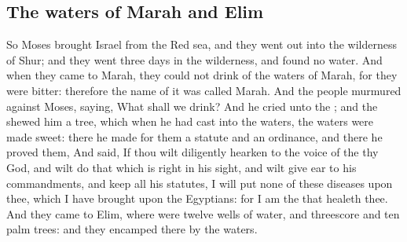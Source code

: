 \begin{biblechapter}
\section*{The waters of Marah and Elim}
\verse So Moses brought Israel from the Red sea, and they went out into the wilderness of Shur; and they went three days in the wilderness, and found no water.
\verse And when they came to Marah, they could not drink of the waters of Marah, for they were bitter: therefore the name of it was called Marah.
\verse And the people murmured against Moses, saying, What shall we drink?
\verse And he cried unto the \LORD; and the \LORD shewed him a tree, which when he had cast into the waters, the waters were made sweet: there he made for them a statute and an ordinance, and there he proved them,
\verse And said, If thou wilt diligently hearken to the voice of the \LORD thy God, and wilt do that which is right in his sight, and wilt give ear to his commandments, and keep all his statutes, I will put none of these diseases upon thee, which I have brought upon the Egyptians: for I am the \LORD that healeth thee.
\verse And they came to Elim, where were twelve wells of water, and threescore and ten palm trees: and they encamped there by the waters.
\end{biblechapter}

